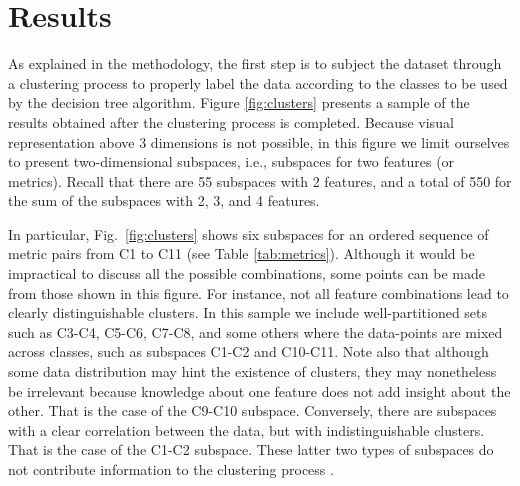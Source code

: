 
\section{Results}
\label{sec:results}

As explained in the methodology, the first step is to subject the dataset through a clustering process to properly label the data according to the classes to be used by the decision tree algorithm. Figure \ref{fig:clusters} presents a sample of the results obtained after the clustering process is completed. Because visual representation above 3 dimensions is not possible, in this figure we limit ourselves to present two-dimensional subspaces, i.e., subspaces for two features (or metrics). Recall that there are 55 subspaces with 2 features, and a total of 550 for the sum of the subspaces with 2, 3, and 4 features. 

In particular, Fig.~\ref{fig:clusters} shows six subspaces for an ordered sequence of metric pairs from C1 to C11 (see Table \ref{tab:metrics}). Although it would be impractical to discuss all the possible combinations, some points can be made from those shown in this figure. For instance, not all feature combinations lead to clearly distinguishable clusters. In this sample we include well-partitioned sets such as C3-C4, C5-C6, C7-C8, and some others where the data-points are mixed across classes, such as subspaces C1-C2 and C10-C11. Note also that although some data distribution may hint the existence of clusters, they may nonetheless be irrelevant because knowledge about one feature does not add insight about the other. That is the case of the C9-C10 subspace. Conversely, there are subspaces with a clear correlation between the data, but with indistinguishable clusters. That is the case of the C1-C2 subspace. These latter two types of subspaces do not contribute information to the clustering process \citep{Dy_2004_MLR}. 

